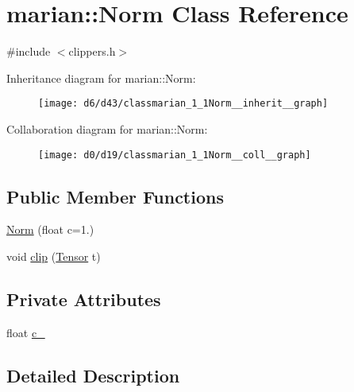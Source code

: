 \hypertarget{classmarian_1_1Norm}{}\section{marian\+:\+:Norm Class Reference}
\label{classmarian_1_1Norm}


{\ttfamily \#include $<$clippers.\+h$>$}



Inheritance diagram for marian\+:\+:Norm\+:
\nopagebreak
\begin{figure}[H]
\begin{center}
\leavevmode
\texttt{[image: d6/d43/classmarian\_1\_1Norm\_\_inherit\_\_graph]}
\end{center}
\end{figure}


Collaboration diagram for marian\+:\+:Norm\+:
\nopagebreak
\begin{figure}[H]
\begin{center}
\leavevmode
\texttt{[image: d0/d19/classmarian\_1\_1Norm\_\_coll\_\_graph]}
\end{center}
\end{figure}
\subsection*{Public Member Functions}
\begin{DoxyCompactItemize}
\item 
\hyperlink{classmarian_1_1Norm_a32a3f587492e69a29182b46a6cf45a3d}{Norm} (float c=1.)
\item 
void \hyperlink{classmarian_1_1Norm_ab57aa03c8725dbb45a2750d30c1516b6}{clip} (\hyperlink{namespacemarian_a88b71ec34bb354564cddc24eb80f7e14}{Tensor} t)
\end{DoxyCompactItemize}
\subsection*{Private Attributes}
\begin{DoxyCompactItemize}
\item 
float \hyperlink{classmarian_1_1Norm_a84440b80fbdc43302662be4b8d1e47d2}{c\+\_\+}
\end{DoxyCompactItemize}


\subsection{Detailed Description}


